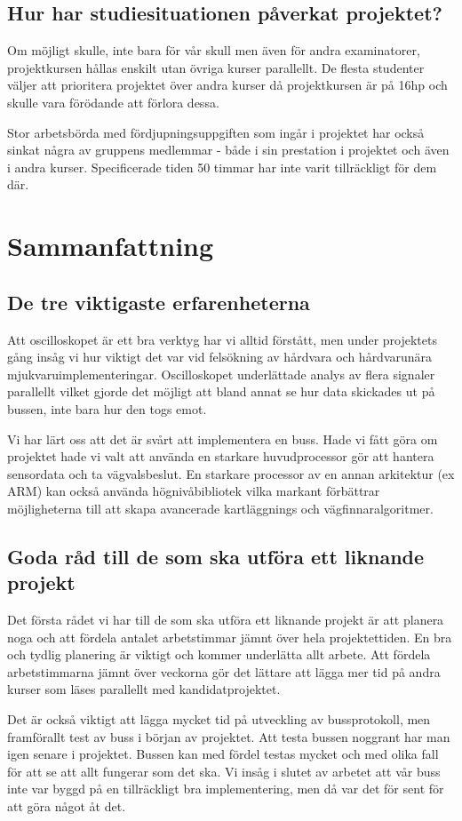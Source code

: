 \documentclass[a4paper,12pt,fleqn]{article}
\begin{document}
\subsection{Hur har studiesituationen påverkat projektet?}
Om möjligt skulle, inte bara för vår skull men även för andra examinatorer, projektkursen hållas enskilt utan övriga kurser parallellt. De flesta studenter  väljer att prioritera projektet över andra kurser då projektkursen är på 16hp och skulle vara förödande att förlora dessa. 

Stor arbetsbörda med fördjupningsuppgiften som ingår i projektet har också sinkat några av gruppens medlemmar - både i sin prestation i projektet och även i andra kurser. Specificerade tiden 50 timmar har inte varit tillräckligt för dem där. 

\section{Sammanfattning}
\subsection{De tre viktigaste erfarenheterna}

Att oscilloskopet är ett bra verktyg har vi alltid förstått, men under projektets gång insåg vi hur viktigt det var vid felsökning av hårdvara och hårdvarunära mjukvaruimplementeringar. Oscilloskopet underlättade analys av flera signaler parallellt vilket gjorde det möjligt att bland annat se hur data skickades ut på bussen, inte bara hur den togs emot.

Vi har lärt oss att det är svårt att implementera en buss. Hade vi fått göra om projektet hade vi valt att använda en starkare huvudprocessor gör att hantera sensordata och ta vägvalsbeslut. En starkare processor av en annan arkitektur (ex ARM) kan också använda högnivåbibliotek vilka markant förbättrar möjligheterna till att skapa avancerade kartläggnings och vägfinnaralgoritmer. 

\subsection{Goda råd till de som ska utföra ett liknande projekt}
Det första rådet vi har till de som ska utföra ett liknande projekt är att planera noga och att fördela antalet arbetstimmar jämnt över hela projektettiden. En bra och tydlig planering är viktigt och kommer underlätta allt arbete. Att fördela arbetstimmarna jämnt över veckorna gör det lättare att lägga mer tid på andra kurser som läses parallellt med kandidatprojektet.

Det är också viktigt att lägga mycket tid på utveckling av bussprotokoll, men framförallt test av buss i början av projektet. Att testa bussen noggrant har man igen senare i projektet. Bussen kan med fördel testas mycket och med olika fall för att se att allt fungerar som det ska. Vi insåg i slutet av arbetet att vår buss inte var byggd på en tillräckligt bra implementering, men då var det för sent för att göra något åt det.
\end{document}
